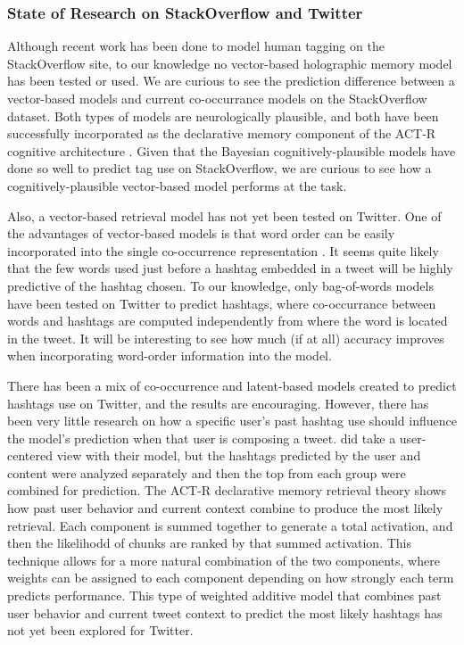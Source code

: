 \documentclass[man]{apa6}
\begin{document}
\subsubsection{State of Research on StackOverflow and Twitter}

Although recent work has been done to model human tagging on the StackOverflow site, to our knowledge no vector-based holographic memory model has been tested or used.
We are curious to see the prediction difference between a vector-based models and current co-occurrance models on the StackOverflow dataset.
Both types of models are neurologically plausible, and both have been successfully incorporated as the declarative memory component of the ACT-R cognitive architecture \parencite{Rutledge2007}. 
Given that the Bayesian cognitively-plausible models have done so well to predict tag use on StackOverflow, we are curious to see how a cognitively-plausible vector-based model performs at the task.

Also, a vector-based retrieval model has not yet been tested on Twitter.
One of the advantages of vector-based models is that word order can be easily incorporated into the single co-occurrence representation \parencite{Jones2007}.
It seems quite likely that the few words used just before a hashtag embedded in a tweet will be highly predictive of the hashtag chosen.
To our knowledge, only bag-of-words models have been tested on Twitter to predict hashtags, where co-occurrance between words and hashtags are computed independently from where the word is located in the tweet.
It will be interesting to see how much (if at all) accuracy improves when incorporating word-order information into the model.

There has been a mix of co-occurrence and latent-based models created to predict hashtags use on Twitter, and the results are encouraging.
However, there has been very little research on how a specific user's past hashtag use should influence the model's prediction when that user is composing a tweet.
\textcite{Kywe2012} did take a user-centered view with their model, but the hashtags predicted by the user and content were analyzed separately and then the top from each group were combined for prediction.
The ACT-R declarative memory retrieval theory shows how past user behavior and current context combine to produce the most likely retrieval.
Each component is summed together to generate a total activation, and then the likelihodd of chunks are ranked by that summed activation.
This technique allows for a more natural combination of the two components, where weights can be assigned to each component depending on how strongly each term predicts performance.
This type of weighted additive model that combines past user behavior and current tweet context to predict the most likely hashtags has not yet been explored for Twitter.
\end{document}
